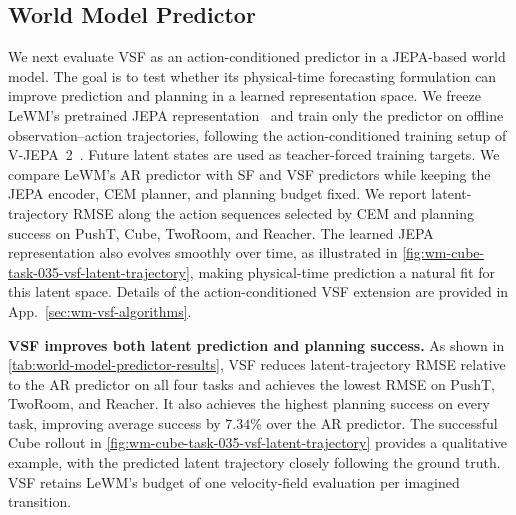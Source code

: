 \subsection{World Model Predictor}
\label{sec:exp-world-model}

We next evaluate VSF as an action-conditioned predictor in a JEPA-based world
model. The goal is to test whether its physical-time forecasting formulation
can improve prediction and planning in a learned representation space. We
freeze LeWM's pretrained JEPA representation~\citep{assran2023self, maes2026leworldmodel} and
train only the predictor on offline observation--action trajectories, following
the action-conditioned training setup of V-JEPA~2~\citep{assran2025v}. Future
latent states are used as teacher-forced training targets.
%
We compare LeWM's AR predictor with SF and VSF predictors while keeping the
JEPA encoder, CEM planner, and planning budget fixed. We report
latent-trajectory RMSE along the action sequences selected by CEM and planning
success on PushT, Cube, TwoRoom, and Reacher. The learned JEPA representation
also evolves smoothly over time, as illustrated in
\cref{fig:wm-cube-task-035-vsf-latent-trajectory}, making physical-time
prediction a natural fit for this latent space. Details of the
action-conditioned VSF extension are provided in
App.~\ref{sec:wm-vsf-algorithms}.

\textbf{VSF improves both latent prediction and planning success.}
As shown in \cref{tab:world-model-predictor-results}, VSF reduces
latent-trajectory RMSE relative to the AR predictor on all four tasks and
achieves the lowest RMSE on PushT, TwoRoom, and Reacher. It also achieves the
highest planning success on every task, improving average success by $7.34\%$
over the AR predictor. The successful Cube rollout in
\cref{fig:wm-cube-task-035-vsf-latent-trajectory} provides a qualitative
example, with the predicted latent trajectory closely following the ground
truth. VSF retains LeWM's budget of one velocity-field evaluation
per imagined transition.


